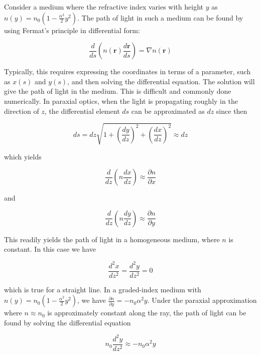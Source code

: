 \documentclass[
  a4paper,
]{book}
\begin{document}
\begin{tcolorbox}[enhanced jigsaw, breakable, toptitle=1mm, bottomrule=.15mm, colbacktitle=quarto-callout-tip-color!10!white, title=\textcolor{quarto-callout-tip-color}{\faLightbulb}\hspace{0.5em}{Example: Light in a Graded-Index Medium}, arc=.35mm, rightrule=.15mm, bottomtitle=1mm, opacityback=0, toprule=.15mm, coltitle=black, leftrule=.75mm, opacitybacktitle=0.6, colback=white, left=2mm, titlerule=0mm, colframe=quarto-callout-tip-color-frame]

Consider a medium where the refractive index varies with height \(y\) as
\(n(y) = n_0 \left(1 - \frac{\alpha^2}{2} y^2\right)\). The path of
light in such a medium can be found by using Fermat's principle in
differential form:

\[
\frac{d}{ds}\left (n(\textbf{r})\frac{d\textbf{r}}{ds}\right)=\nabla n(\textbf{r})
\]

Typically, this requires expressing the coordinates in terms of a
parameter, such as \(x(s)\) and \(y(s)\), and then solving the
differential equation. The solution will give the path of light in the
medium. This is difficult and commonly done numerically. In paraxial
optics, when the light is propagating roughly in the direction of \(z\),
the differential element \(ds\) can be approximated as \(dz\) since then

\[
ds=dz\sqrt{1+\left (\frac{dy}{dz}\right )^2+\left (\frac{dx}{dz}\right)^2}\approx dz
\]

which yields

\[
\frac{d}{dz}\left (n\frac{dx}{dz}\right)\approx \frac{\partial n}{\partial x}
\]

and

\[
\frac{d}{dz}\left (n\frac{dy}{dz}\right )\approx \frac{\partial n}{\partial y}
\]

This readily yields the path of light in a homogeneous medium, where
\(n\) is constant. In this case we have

\[
\frac{d^2 x}{dz^2}=\frac{d^2 y}{dz^2}=0
\]

which is true for a straight line. In a graded-index medium with
\(n(y) = n_0 \left(1 - \frac{\alpha^2}{2} y^2\right)\), we have
\(\frac{\partial n}{\partial y} = -n_0 \alpha^2 y\). Under the paraxial
approximation where \(n \approx n_0\) is approximately constant along
the ray, the path of light can be found by solving the differential
equation

\[
n_0 \frac{d^2 y}{dz^2} \approx -n_0 \alpha^2 y
\]


\end{tcolorbox}
\end{document}
